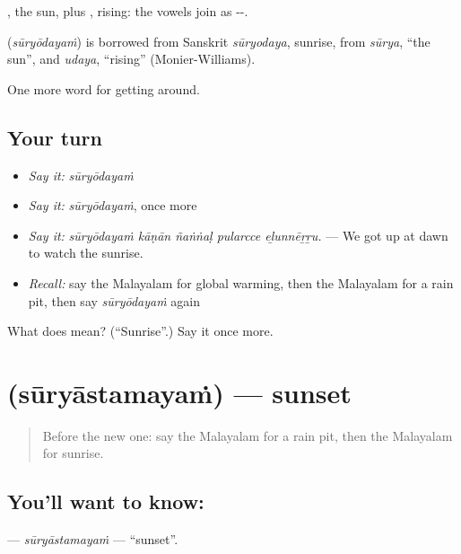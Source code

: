, the sun, plus , rising: the vowels join as --.

\begin{cousinweb}
\textbf{} (\emph{sūryōdayaṁ}) is borrowed from Sanskrit \emph{sūryodaya}, sunrise, from \emph{sūrya}, \textquotedblleft{}the sun\textquotedblright{}, and \emph{udaya}, \textquotedblleft{}rising\textquotedblright{} (Monier-Williams).
\end{cousinweb}

\begin{grammarlens}[title={What you've built}]
One more word for getting around.
\end{grammarlens}

\subsection*{Your turn}
\begin{itemize}
\raggedright
  \item \emph{Say it:} \emph{sūryōdayaṁ}
  \item \emph{Say it:} \emph{sūryōdayaṁ}, once more
  \item \emph{Say it:} \emph{sūryōdayaṁ kāṇān ñaṅṅaḷ pularcce eḻunnēṟṟu.} — We got up at dawn to watch the sunrise.
  \item \emph{Recall:} say the Malayalam for global warming, then the Malayalam for a rain pit, then say \emph{sūryōdayaṁ} again
\end{itemize}

\begin{tcolorbox}[breakable,colback=teal!4,colframe=teal!35!black,title={Before you move on}]
What does  mean? (\textquotedblleft{}Sunrise\textquotedblright{}.) Say it once more.
\end{tcolorbox}
\section[\texorpdfstring{\ml{സൂര്യാസ്തമയം} (sūryāstamayaṁ)}{സൂര്യാസ്തമയം (sūryāstamayaṁ)}]{ (sūryāstamayaṁ) — sunset}

\label{lesson:ML-C506-suryastamayam}



\begin{quote}
Before the new one: say the Malayalam for a rain pit, then the Malayalam for sunrise.
\end{quote}

\subsection*{You'll want to know: }
\textbf{} — \emph{sūryāstamayaṁ} — \textquotedblleft{}sunset\textquotedblright{}.

